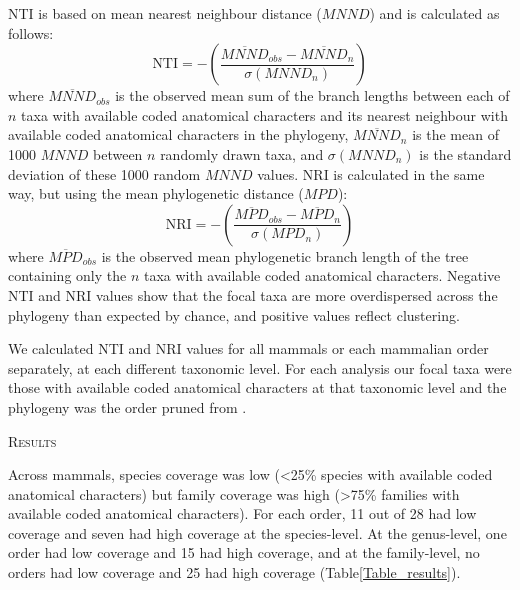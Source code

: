 \documentclass[12pt,letterpaper]{article}
\renewcommand{\section}[1]{%
\bigskip
\begin{center}
\begin{Large}
\normalfont\scshape #1
\medskip
\end{Large}
\end{center}}
\begin{document}
NTI \cite{webb2002phylogenies} is based on mean nearest neighbour distance ($MNND$) and is calculated as follows:
  \begin{equation}
    \text{NTI}=-\left(\frac{\overline{MNND}_{obs}-\overline{MNND}_{n}}{\sigma(MNND_{n})}\right)
  \end{equation}
where $\overline{MNND}_{obs}$ is the observed mean sum of the branch lengths between each of $n$ taxa with available coded anatomical characters and its nearest neighbour with available coded anatomical characters in the phylogeny, 
$\overline{MNND}_{n}$ is the mean of 1000 $MNND$ between $n$ randomly drawn taxa, and $\sigma(MNND_{n})$ is the standard deviation of these 1000 random $MNND$ values.
NRI is calculated in the same way, but using the mean phylogenetic distance ($MPD$):
  \begin{equation}
    \text{NRI}=-\left(\frac{\overline{MPD}_{obs}-\overline{MPD}_{n}}{\sigma(MPD_{n})}\right)
  \end{equation}
where $\overline{MPD}_{obs}$ is the observed mean phylogenetic branch length of the tree containing only the $n$ taxa with available coded anatomical characters.
Negative NTI and NRI values show that the focal taxa are more overdispersed across the phylogeny than expected by chance, and positive values reflect clustering.

We calculated NTI and NRI values for all mammals or each mammalian order separately, at each different taxonomic level. 
For each analysis our focal taxa were those with available coded anatomical characters at that taxonomic level and the phylogeny was the order pruned from \cite{BinindaEmonds}.

%
%


\section{Results}
Across mammals, species coverage was low (\textless 25\% species with available coded anatomical characters) but family coverage was high (\textgreater 75\% families with available coded anatomical characters).
For each order, 11 out of 28 had low coverage and seven had high coverage at the species-level.
At the genus-level, one order had low coverage and 15 had high coverage, and at the family-level, no orders had low coverage and 25 had high coverage (Table\ref{Table_results}).

\end{document}
